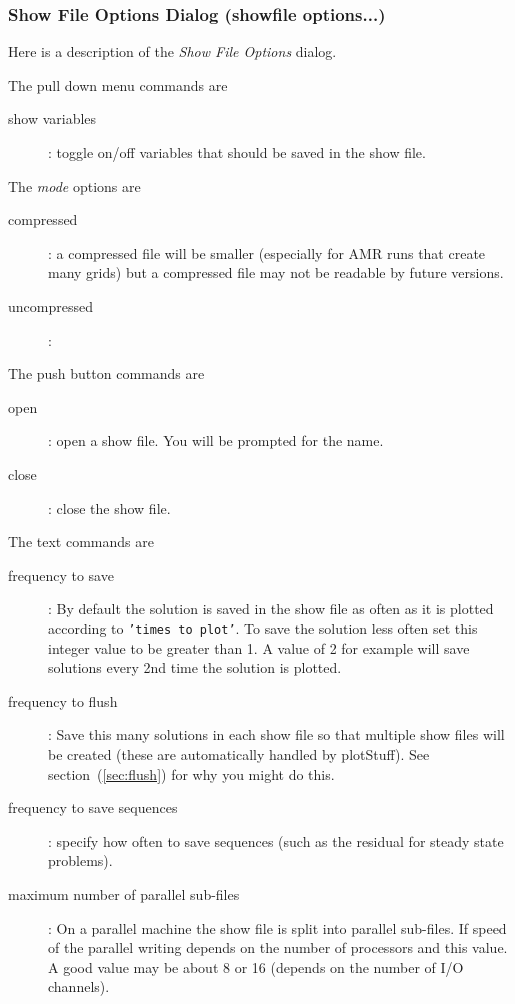 \subsubsection{Show File Options Dialog (showfile options...)}\label{sec:showfileOptions}

Here is a description of the {\em Show File Options} dialog.

\noindent The pull down menu commands are
\begin{description}
  \item[\qquad show variables] : toggle on/off variables that should be saved in the show file.
\end{description}

\noindent The {\em mode} options are
\begin{description}
  \item[\qquad compressed] : a compressed file will be
         smaller (especially for AMR runs that create many grids) but a compressed file may not
         be readable by future versions. 
  \item[\qquad uncompressed] : 
\end{description}

\noindent The push button commands are
\begin{description}
  \item[\qquad open] : open a show file. You will be prompted for the name.
  \item[\qquad close] : close the show file.
\end{description}

\noindent The text commands are
\begin{description}
  \item[\qquad frequency to save] : By default the solution is saved in the show file
        as often as it is plotted according to {\tt 'times to plot'}. To save the solution less
        often set this integer value to be greater than 1. A value of 2 for example will save solutions
        every 2nd time the solution is plotted.
  \item[\qquad frequency to flush] : Save this many solutions in each show file so that multiple
      show files will be created (these are automatically handled by plotStuff). See section~(\ref{sec:flush})
      for why you might do this.  
  \item[\qquad frequency to save sequences] : specify how often to save sequences (such as the residual for
                steady state problems).
  \item[\qquad maximum number of parallel sub-files] : On a parallel machine the show file is split into
    parallel sub-files. If speed of the parallel writing depends on the number of processors and
      this value. A good value may be about 8 or 16 (depends on the number of I/O channels). 
\end{description}
